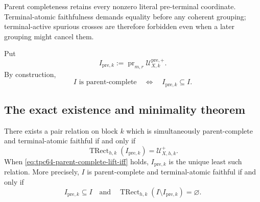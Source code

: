 Parent completeness retains every nonzero literal pre-terminal coordinate.
Terminal-atomic faithfulness demands equality before any coherent grouping;
terminal-active spurious crosses are therefore forbidden even when a later
grouping might cancel them.

Put
\begin{equation}
 I_{\mathrm{pre},k}
 :=
 \operatorname{pr}_{m,r}
 \mathcal U_{X,k}^{\mathrm{pre},+}.
 \label{eq:tpc64-minimal-parent-relation}
\end{equation}
By construction,
\begin{equation}
 I\text{ is parent-complete}
 \quad\Longleftrightarrow\quad
 I_{\mathrm{pre},k}\subseteq I.
 \label{eq:tpc64-parent-complete-relation-inclusion}
\end{equation}

\subsection{The exact existence and minimality theorem}

\begin{theorem}
\label{thm:tpc64-parent-complete-faithful-lift}
There exists a pair relation on block \(k\) which is simultaneously
parent-complete and terminal-atomic faithful if and only if
\begin{equation}
 \boxed{
 \operatorname{TRect}_{h,k}(I_{\mathrm{pre},k})
 =\mathcal U_{X,h,k}^{+}.}
 \label{eq:tpc64-parent-complete-lift-iff}
\end{equation}
When \eqref{eq:tpc64-parent-complete-lift-iff} holds,
\(I_{\mathrm{pre},k}\) is the unique least such relation.  More precisely,
\(I\) is parent-complete and terminal-atomic faithful if and only if
\begin{equation}
 I_{\mathrm{pre},k}\subseteq I
 \quad\text{and}\quad
 \operatorname{TRect}_{h,k}
     (I\setminus I_{\mathrm{pre},k})=\varnothing.
 \label{eq:tpc64-all-parent-complete-faithful-relations}
\end{equation}
\end{theorem}

